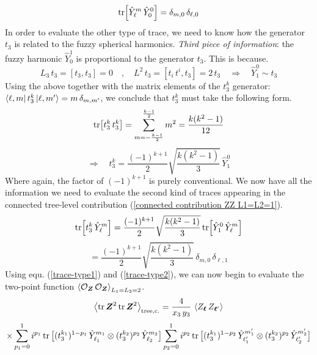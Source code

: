 %
%
\begin{equation}\label{trace-type1}
\tr[ \hat{Y}_{\ell}^{m} \, \hat{Y}_{0}^{0} ]
=
\delta_{m,0} \, \delta_{\ell,0}
\end{equation}
%
%
In order to evaluate the other type of trace, we need to know how the generator $t_3$ is related to the fuzzy spherical harmonics. \textit{Third piece of information}: the fuzzy harmonic $\hat{Y}_{0}^{1}$ is proportional to the generator $t_3$. This is because.
%
%
\begin{equation}
L_3 \, t_3 = [t_3, t_3] = 0
%
\quad , \quad
%
L^2 \, t_3 = [t_i \, t^i, t_3] = 2 \, t_3
%
\quad \Rightarrow \quad
%
\hat{Y}^0_1 \sim t_3
\end{equation}
%
%
Using the above together with the matrix elements of the $t_3^k$ generator: $\bra{\ell, m} t_3^k \ket{\ell, m'} = m \, \delta_{m,m'}$, we conclude that $t_3^k$ must take the following form.
%
%
\begin{equation*}
\tr[t_3^k \, t_3^k]
=
\sum_{m=-\frac{k-1}{2}}^{\frac{k-1}{2}} m^2
=
\frac{k (k^2 - 1)}{12}
\end{equation*}
%
%
\begin{equation}
 \Rightarrow \quad
%
t_3^{k}
=
\frac{(-1)^{k+1}}{2} \sqrt{\frac{k (k^2 - 1)}{3}} \, 
\hat{Y}_1^0
\end{equation}
%
%
Where again, the factor of $(-1)^{k+1}$ is purely conventional. We now have all the information we need to evaluate the second kind of traces appearing in the connected tree-level contribution (\ref{connected contribution ZZ L1=L2=1}).
%
%
\begin{equation*}
\tr[t_3^{k} \, \hat{Y}_\ell^m]
=
\frac{(-1)^{k+1}}{2} \sqrt{\frac{k (k^2 - 1)}{3}}
\tr[\hat{Y}_1^0 \, \hat{Y}_\ell^m]
\end{equation*}
%
%
\begin{equation}\label{trace-type2}
=
\frac{(-1)^{k+1}}{2} \sqrt{\frac{k (k^2 - 1)}{3}} \, 
\delta_{m, 0} \, \delta_{\ell, 1}
\end{equation}
%
%
Using equ. (\ref{trace-type1}) and (\ref{trace-type2}), we can now begin to evaluate the two-point function $\expval{\mathcal{O}_{\boldsymbol{Z}} \, \mathcal{O}_{\boldsymbol{Z}}}_{L_1=L_2=2}$.
%
%
\begin{equation*}
\expval{\tr \boldsymbol{Z}^2 \tr \boldsymbol{Z}^2}_{\mathrm{tree,c.}}
=
\frac{4}{x_3 \, y_3} \,
\expval{Z_{\boldsymbol{\ell}} \, Z_{\boldsymbol{\ell}'}} 
\end{equation*}
%
%
\begin{equation*}
\times
\sum_{p_1=0}^{1} i^{p_1}
\tr \big[ (t_3^{k_1})^{1 - p_1} \, \hat{Y}_{\ell_1}^{m_1}
\otimes
(t_3^{k_2})^{p_2} \, \hat{Y}_{\ell_2}^{m_2} \big] 
\sum_{p_2=0}^{1} i^{p_2}
\tr \big[ (t_3^{k_1})^{1 - p_2} \, \hat{Y}_{\ell_1'}^{m_1'}
\otimes
(t_3^{k_2})^{p_2} \, \hat{Y}_{\ell_2'}^{m_2'} \big]
\end{equation*}
%
%

